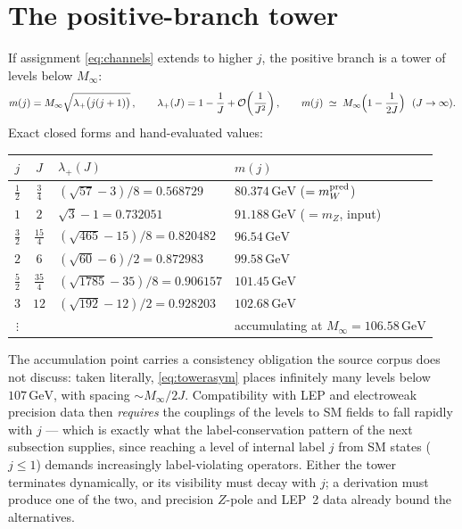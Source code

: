 \documentclass[11pt,a4paper]{article}
\theoremstyle{definition}
\newcommand{\GeV}{\,\mathrm{GeV}}
\newcommand{\Minf}{M_\infty}
\begin{document}
\section{The positive-branch tower}
\label{sec:tower}

If assignment \eqref{eq:channels} extends to higher $j$, the positive
branch is a tower of levels below $\Minf$:
\begin{equation}
m(j)=\Minf\sqrt{\lambda_+\bigl(j(j+1)\bigr)}\,,
\qquad
\lambda_+(J) = 1-\frac1J+\mathcal{O}\!\left(\frac1{J^2}\right),
\qquad
m(j)\;\simeq\;\Minf\Bigl(1-\frac{1}{2J}\Bigr)\ \ (J\to\infty).
\label{eq:towerasym}
\end{equation}
Exact closed forms and hand-evaluated values:
\begin{center}
\begin{tabular}{ccll}
\toprule
$j$ & $J$ & $\lambda_+(J)$ & $m(j)$ \\
\midrule
$\tfrac12$ & $\tfrac34$ & $(\sqrt{57}-3)/8=0.568729$ & $80.374\GeV$ ($=m_W^{\rm pred}$)\\
$1$ & $2$ & $\sqrt3-1=0.732051$ & $91.188\GeV$ ($=m_Z$, input)\\
$\tfrac32$ & $\tfrac{15}4$ & $(\sqrt{465}-15)/8=0.820482$ & $96.54\GeV$\\
$2$ & $6$ & $(\sqrt{60}-6)/2=0.872983$ & $99.58\GeV$\\
$\tfrac52$ & $\tfrac{35}4$ & $(\sqrt{1785}-35)/8=0.906157$ & $101.45\GeV$\\
$3$ & $12$ & $(\sqrt{192}-12)/2=0.928203$ & $102.68\GeV$\\
$\vdots$ & & & accumulating at $\Minf=106.58\GeV$\\
\bottomrule
\end{tabular}
\end{center}

The accumulation point carries a consistency obligation the source corpus
does not discuss: taken literally, \eqref{eq:towerasym} places infinitely
many levels below $107\GeV$, with spacing $\sim\Minf/2J$. Compatibility
with LEP and electroweak precision data then \emph{requires} the couplings
of the levels to SM fields to fall rapidly with $j$ --- which is exactly
what the label-conservation pattern of the next subsection supplies,
since reaching a level of internal label $j$ from SM states ($j\le1$)
demands increasingly label-violating operators. Either the tower
terminates dynamically, or its visibility must decay with $j$; a
derivation must produce one of the two, and precision $Z$-pole and LEP~2
data already bound the alternatives.
\end{document}
